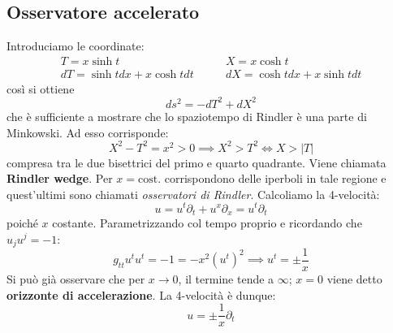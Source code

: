 \subsection{Osservatore accelerato}
Introduciamo le coordinate:
\begin{align*}
    T= x\sinh t &\qquad X= x\cosh t \\
    dT = \sinh t dx + x\cosh t dt &\qquad dX= \cosh t dx + x\sinh t dt
\end{align*}
così si ottiene
\begin{equation*}
    ds^2 = -dT^2 +dX^2
\end{equation*}
che è sufficiente a mostrare che lo spaziotempo di Rindler è una parte di Minkowski. Ad esso corrisponde:
\begin{equation*}
    X^2 - T^2 = x^2 >0 \implies X^2 > T^2 \iff X > |T|
\end{equation*}
compresa tra le due bisettrici del primo e quarto quadrante. Viene chiamata \textbf{Rindler wedge}.
Per $x= \textrm{cost.}$ corrispondono delle iperboli in tale regione e quest'ultimi sono chiamati \emph{osservatori di Rindler}. Calcoliamo la 4-velocità:
\begin{equation*}
    u = u^t\partial_t +u^x \partial_x = u^t \partial_t
\end{equation*}
poiché $x$ costante. Parametrizzando col tempo proprio e ricordando che $u_j u^j=-1$:
\begin{equation*}
    g_{tt}u^t u^t = -1 = -x^2(u^t)^2 \implies u^t = \pm \frac{1}{x}
\end{equation*}
Si può già osservare che per $x\rightarrow 0$, il termine tende a $\infty$; $x=0$ viene detto \textbf{orizzonte di accelerazione}. La 4-velocità è dunque:
\begin{equation*}
    u= \pm \frac{1}{x}\partial_t
\end{equation*}

